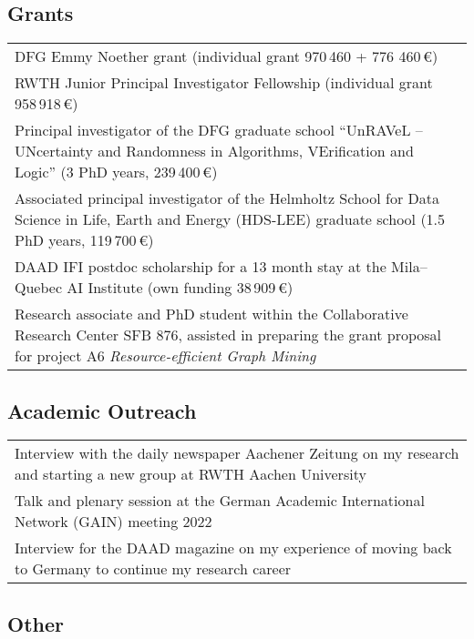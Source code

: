 \documentclass[11pt, a4paper, DIV=14, headings=small]{scrartcl}
\begin{document}
	\subsection*{Grants}
	\begin{tabular}{p{14.5cm}} 
	DFG Emmy Noether grant (individual grant 970\,460 + 776 460\,€)\\   
		RWTH Junior Principal Investigator Fellowship (individual grant 958\,918\,€)                                    \\
		 	
		Principal investigator of the DFG graduate school ``UnRAVeL -- UNcertainty and Randomness in Algorithms, VErification and Logic''  (3 PhD years, 239\,400\,€) \\
				
		Associated principal investigator of the Helmholtz School for Data Science in Life, Earth and Energy (HDS-LEE) graduate school (1.5 PhD years, 119\,700\,€) \\
		
		DAAD IFI postdoc scholarship for a 13 month stay at the Mila--Quebec AI Institute (own funding 38\,909\,€) \\
		
		Research associate and PhD student  within the Collaborative Research Center SFB 876, assisted in preparing the  grant proposal for project A6 \emph{Resource-efficient Graph Mining}\\
	\end{tabular}
	
	\subsection*{Academic Outreach}
	\begin{tabular}{p{14.5cm}}	
		Interview with the daily newspaper Aachener Zeitung on my research and starting a new group at RWTH Aachen University \\	
		Talk and plenary session at the German Academic International Network (GAIN) meeting 2022 \\
		
		Interview for the DAAD magazine on my experience of moving back to Germany to continue my research career
	\end{tabular}
	
	\subsection*{Other}
	
\end{document}
